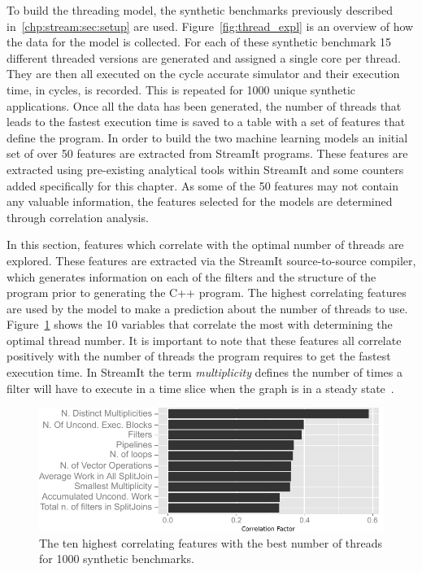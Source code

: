 To build the threading model, the synthetic benchmarks previously described in~\ref{chp:stream:sec:setup} are used.
Figure~\ref{fig:thread_expl} is an overview of how the data for the model is collected.
For each of these synthetic benchmark 15 different threaded versions are generated and assigned a single core per thread.
They are then all executed on the cycle accurate simulator and their execution time, in cycles, is recorded.
This is repeated for 1000 unique synthetic applications. 
Once all the data has been generated, the number of threads that leads to the fastest execution time is saved to a table with a set of features that define the program.
In order to build the two machine learning models an initial set of over 50 features are extracted from StreamIt programs.
These features are extracted using pre-existing analytical tools within StreamIt and some counters added specifically for this chapter.
As some of the 50 features may not contain any valuable information, the features selected for the models are determined through correlation analysis.

In this section, features which correlate with the optimal number of threads are explored.
These features are extracted via the StreamIt source-to-source compiler, which generates information on each of the filters and the structure of the program prior to generating the C++ program.
The highest correlating features are used by the model to make a prediction about the number of threads to use.
Figure~\ref{fig:corr} shows the 10 variables that correlate the most with determining the optimal thread number.
It is important to note that these features all correlate positively with the number of threads the program requires to get the fastest execution time.
In StreamIt the term \textit{multiplicity} defines the number of times a filter will have to execute in a time slice when the graph is in a steady state~\cite{gordon2002streamcomp}.

\begin{figure}[t]
  \centering
 \includegraphics[width=1\textwidth]{streamit-paper/graphics/corrThreadRemix2.pdf}
  \caption{The ten highest correlating features with the best number of threads for 1000 synthetic benchmarks.}\label{fig:corr}
\end{figure}
 
